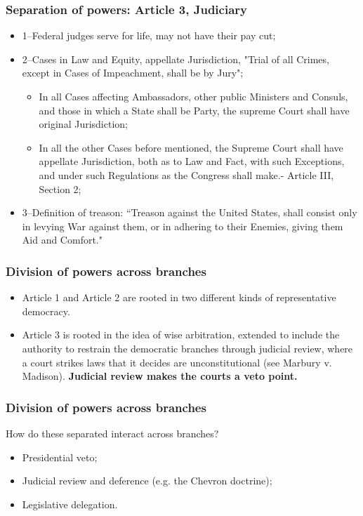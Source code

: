 \documentclass[aspectratio=169]{beamer}
\theoremstyle{principle}
\begin{document}
\begin{frame}
\frametitle{Separation of powers: Article 3, Judiciary}

\begin{itemize} 
\item 1--Federal judges serve for life, may not have their pay cut;
\bigskip
\item 2--Cases in Law and Equity, appellate Jurisdiction, "Trial of all Crimes, except in Cases of Impeachment, shall be by Jury";
\bigskip
\begin{itemize}
\item In all Cases affecting Ambassadors, other public Ministers and Consuls, and those in which a State shall be Party, the supreme Court shall have original Jurisdiction;
\bigskip
\item In all the other Cases before mentioned, the Supreme Court shall have appellate Jurisdiction, both as to Law and Fact, with such Exceptions, and under such Regulations as the Congress shall make.- Article III, Section 2;
\bigskip
\end{itemize}
\item 3--Definition of treason: ``Treason against the United States, shall consist only in levying War against them, or in adhering to their Enemies, giving them Aid and Comfort."
\end{itemize}

\end{frame}

\begin{frame}
\frametitle{Division of powers across branches}

\begin{itemize} 
\item Article 1 and Article 2 are rooted in two different kinds of representative democracy.
\bigskip
\bigskip
\item Article 3 is rooted in the idea of wise arbitration, extended to include the authority to restrain the democratic branches through judicial review, where a court strikes laws that it decides are unconstitutional (see Marbury v. Madison). \textbf{Judicial review makes the courts a veto point.}
\end{itemize}

\end{frame}

\begin{frame}
\frametitle{Division of powers across branches}
How do these separated interact across branches?
\bigskip
\begin{itemize} 
\item Presidential veto;
\bigskip
\bigskip
\item Judicial review and deference (e.g. the Chevron doctrine);
\bigskip
\bigskip
\item Legislative delegation.
\end{itemize}

\end{frame}
\end{document}
